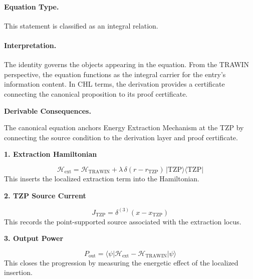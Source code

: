 \paragraph{Equation Type.}
This statement is classified as an integral relation.

\paragraph{Interpretation.}
The identity governs the objects appearing in the equation. From the TRAWIN perspective, the equation functions as the integral carrier for the entry’s information content. In CHL terms, the derivation provides a certificate connecting the canonical proposition to its proof certificate.

\par\vspace{0.35em}
\noindent\textbf{Derivable Consequences.}\quad
\begingroup
\footnotesize
\raggedright
The canonical equation anchors Energy Extraction Mechanism at the TZP by connecting the source condition to the derivation layer and proof certificate.
\par\endgroup

\noindent\textbf{1. Extraction Hamiltonian}\par
\[
\mathcal{H}_{\mathrm{ext}}
=
\mathcal{H}_{\mathrm{TRAWIN}}+\lambda\,\delta(r-r_{\mathrm{TZP}})\,\vert \mathrm{TZP}\rangle\langle \mathrm{TZP}\vert
\]
\noindent This inserts the localized extraction term into the Hamiltonian.\par
\noindent\textbf{2. TZP Source Current}\par
\[
J_{\mathrm{TZP}}=\delta^{(3)}(x-x_{\mathrm{TZP}})
\]
\noindent This records the point-supported source associated with the extraction locus.\par
\noindent\textbf{3. Output Power}\par
\[
P_{\mathrm{out}}
=
\langle\psi\vert \mathcal{H}_{\mathrm{ext}}-\mathcal{H}_{\mathrm{TRAWIN}}\vert\psi\rangle
\]
\noindent This closes the progression by measuring the energetic effect of the localized insertion.\par


